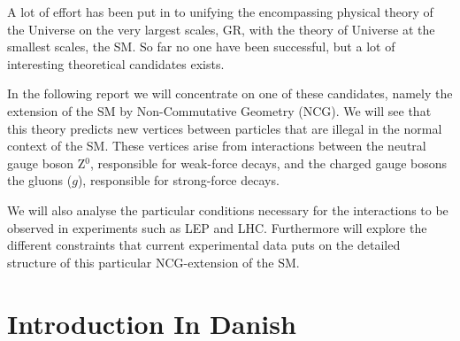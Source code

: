 A lot of effort has been put in to unifying the encompassing physical theory of the Universe on the very largest scales, GR, with the theory of Universe at the smallest scales, the SM. So far no one have been successful, but a lot of interesting theoretical candidates exists.

In the following report we will concentrate on one of these candidates, namely the extension of the SM by Non-Commutative Geometry (NCG). We will see that this theory predicts new vertices between particles that are illegal in the normal context of the SM. These vertices arise from interactions between the neutral gauge boson Z$^0$, responsible for weak-force decays, and the charged gauge bosons the gluons ($g$), responsible for strong-force decays.

We will also analyse the particular conditions necessary for the interactions to be observed in experiments such as LEP and LHC. Furthermore will explore the different constraints that current experimental data puts on the detailed structure of this particular NCG-extension of the SM.

\newpage
\section{Introduction In Danish}